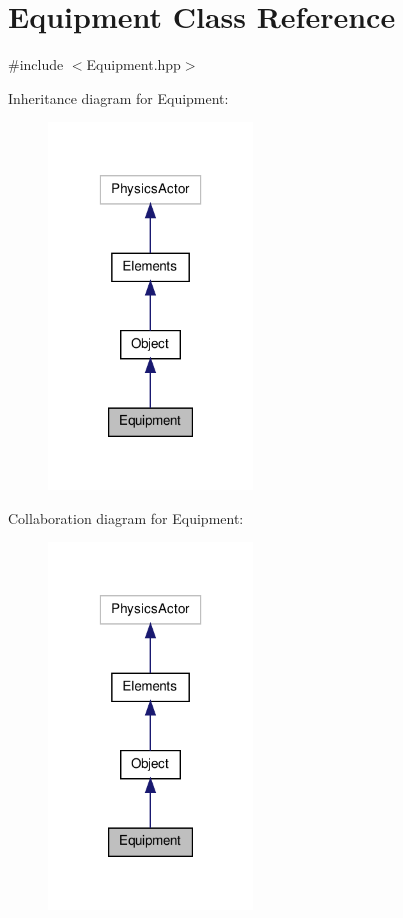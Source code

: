 \hypertarget{class_equipment}{\section{Equipment Class Reference}
\label{class_equipment}
}


{\ttfamily \#include $<$Equipment.\-hpp$>$}



Inheritance diagram for Equipment\-:\nopagebreak
\begin{figure}[H]
\begin{center}
\leavevmode
\includegraphics[width=154pt]{class_equipment__inherit__graph}
\end{center}
\end{figure}


Collaboration diagram for Equipment\-:\nopagebreak
\begin{figure}[H]
\begin{center}
\leavevmode
\includegraphics[width=154pt]{class_equipment__coll__graph}
\end{center}
\end{figure}
